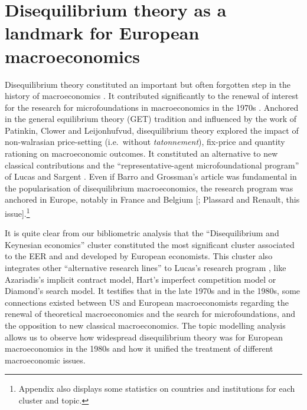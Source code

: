 \documentclass[]{elsarticle} %
\begin{document}
\hypertarget{disequilibrium}{%
\section{Disequilibrium theory as a landmark for European
macroeconomics}\label{disequilibrium}}

Disequilibrium theory constituted an important but often forgotten step
in the history of macroeconomics
\citep{backhouseboianovski2013, plassard2021}. It contributed
significantly to the renewal of interest for the research for
microfoundations in macroeconomics in the 1970s \citep[see][ for a
history of microfoundations in macroeconomics]{duartelima2012a}.
Anchored in the general equilibrium theory (GET) tradition and
influenced by the work of Patinkin, Clower and Leijonhufvud,
disequilibrium theory explored the impact of non-walrasian price-setting
(i.e.~without \emph{tatonnement}), fix-price and quantity rationing on
macroeconomic outcomes. It constituted an alternative to new classical
contributions and the ``representative-agent microfoundational program''
of Lucas and Sargent \citetext{\citealp{hoover2012}; \citealp[see
also][]{renault2020a}}. Even if Barro and Grossman's
\citeyearpar{barro1971} article was fundamental in the popularisation of
disequilibrium macroeconomics, the research program was anchored in
Europe, notably in France and Belgium {[}\citet{goutsmedt2021}; Plassard
and Renault, this issue{]}.\footnote{Appendix also displays some
  statistics on countries and institutions for each cluster and topic.}

It is quite clear from our bibliometric analysis that the
``Disequilibrium and Keynesian economics'' cluster constituted the most
significant cluster associated to the EER and and developed by European
economists. This cluster also integrates other ``alternative research
lines'' to Lucas's research program \citep[chapter 14]{devroey2016},
like Azariadis's \citeyearpar{azariadis1975} implicit contract model,
Hart's \citeyearpar{hart1982} imperfect competition model or Diamond's
\citeyearpar{diamond1982} search model. It testifies that in the late
1970s and in the 1980s, some connections existed between US and European
macroeconomists regarding the renewal of theoretical macroeconomics and
the search for microfoundations, and the opposition to new classical
macroeconomics. The topic modelling analysis allows us to observe how
widespread disequilibrium theory was for European macroeconomics in the
1980s and how it unified the treatment of different macroeconomic
issues.
\end{document}
